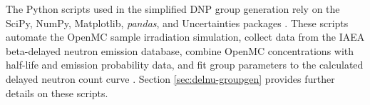 The Python scripts used in the simplified \gls{DNP} group generation rely on the SciPy, NumPy, Matplotlib, \textit{pandas}, and Uncertainties packages \cite{scipy, numpy, matplotlib, pandas, uncertaintiespackage}.
These scripts automate the OpenMC sample irradiation simulation, collect data from the \gls{IAEA} beta-delayed neutron emission database, combine OpenMC concentrations with half-life and emission probability data, and fit group parameters to the calculated delayed neutron count curve \cite{DIMITRIOU2021144}.
Section \ref{sec:delnu-groupgen} provides further details on these scripts.